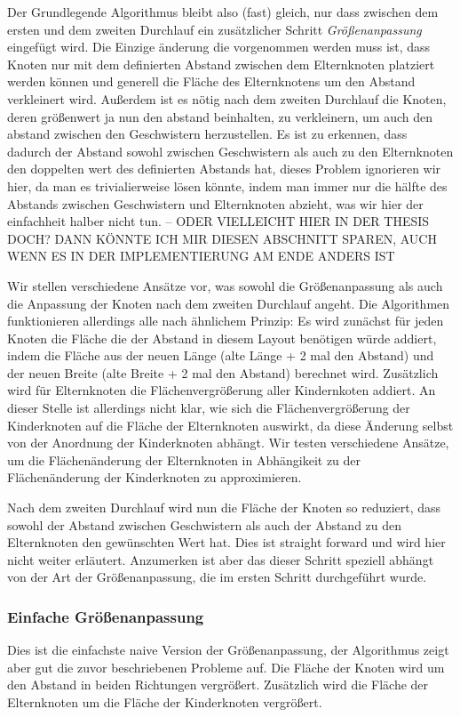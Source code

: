 Der Grundlegende Algorithmus bleibt also (fast) gleich, nur dass zwischen dem ersten und dem zweiten Durchlauf ein zusätzlicher Schritt \textit{Größenanpassung} eingefügt wird. Die Einzige änderung die vorgenommen werden muss ist, dass Knoten nur mit dem definierten Abstand zwischen dem Elternknoten platziert werden können und generell die Fläche des Elternknotens um den Abstand verkleinert wird.
Außerdem ist es nötig nach dem zweiten Durchlauf die Knoten, deren größenwert ja nun den abstand beinhalten, zu verkleinern, um auch den abstand zwischen den Geschwistern herzustellen. Es ist zu erkennen, dass dadurch der Abstand sowohl zwischen Geschwistern als auch zu den Elternknoten den doppelten wert des definierten Abstands hat, dieses Problem ignorieren wir hier, da man es trivialierweise lösen könnte, indem man immer nur die hälfte des Abstands zwischen Geschwistern und Elternknoten abzieht, was wir hier der einfachheit halber nicht tun. -- ODER VIELLEICHT HIER IN DER THESIS DOCH? DANN KÖNNTE ICH MIR DIESEN ABSCHNITT SPAREN, AUCH WENN ES IN DER IMPLEMENTIERUNG AM ENDE ANDERS IST

Wir stellen verschiedene Ansätze vor, was sowohl die Größenanpassung als auch die Anpassung der Knoten nach dem zweiten Durchlauf angeht.
Die Algorithmen funktionieren allerdings alle nach ähnlichem Prinzip: Es wird zunächst für jeden Knoten die Fläche die der Abstand in diesem Layout benötigen würde addiert, indem die Fläche aus der neuen Länge (alte Länge + 2 mal den Abstand) und der neuen Breite (alte Breite + 2 mal den Abstand) berechnet wird. Zusätzlich wird für Elternknoten die Flächenvergrößerung aller Kindernkoten addiert. An dieser Stelle ist allerdings nicht klar, wie sich die Flächenvergrößerung der Kinderknoten auf die Fläche der Elternknoten auswirkt, da diese Änderung selbst von der Anordnung der Kinderknoten abhängt. Wir testen verschiedene Ansätze, um die Flächenänderung der Elternknoten in Abhängikeit zu der Flächenänderung der Kinderknoten zu approximieren.

Nach dem zweiten Durchlauf wird nun die Fläche der Knoten so reduziert, dass sowohl der Abstand zwischen Geschwistern als auch der Abstand zu den Elternknoten den gewünschten Wert hat. Dies ist straight forward und wird hier nicht weiter erläutert. Anzumerken ist aber das dieser Schritt speziell abhängt von der Art der Größenanpassung, die im ersten Schritt durchgeführt wurde.

\subsubsection{Einfache Größenanpassung}
Dies ist die einfachste naive Version der Größenanpassung, der Algorithmus zeigt aber gut die zuvor beschriebenen Probleme auf. Die Fläche der Knoten wird um den Abstand in beiden Richtungen vergrößert. Zusätzlich wird die Fläche der Elternknoten um die Fläche der Kinderknoten vergrößert. 


